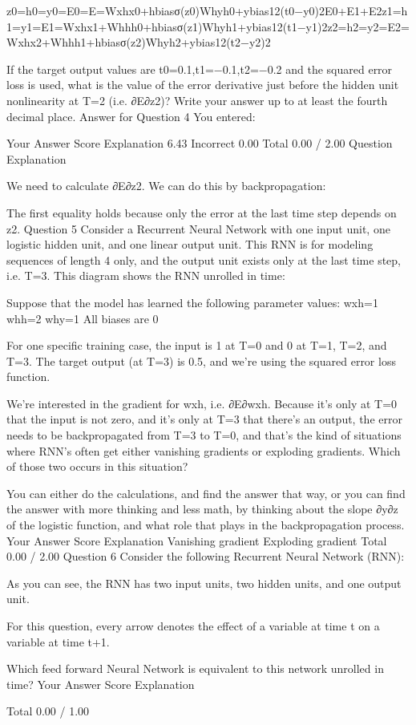 z0=h0=y0=E0=E=Wxhx0+hbiasσ(z0)Whyh0+ybias12(t0−y0)2E0+E1+E2z1=h1=y1=E1=Wxhx1+Whhh0+hbiasσ(z1)Whyh1+ybias12(t1−y1)2z2=h2=y2=E2=Wxhx2+Whhh1+hbiasσ(z2)Whyh2+ybias12(t2−y2)2

If the target output values are t0=0.1,t1=−0.1,t2=−0.2 and the squared error loss is used, what is the value of the error derivative just before the hidden unit nonlinearity at T=2 (i.e. ∂E∂z2)? Write your answer up to at least the fourth decimal place.
Answer for Question 4
You entered:

Your Answer		Score	Explanation
6.43	Incorrect	0.00	
Total		0.00 / 2.00	
Question Explanation

We need to calculate ∂E∂z2. We can do this by backpropagation:


The first equality holds because only the error at the last time step depends on z2.
Question 5
Consider a Recurrent Neural Network with one input unit, one logistic hidden unit, and one linear output unit. This RNN is for modeling sequences of length 4 only, and the output unit exists only at the last time step, i.e. T=3. This diagram shows the RNN unrolled in time:


Suppose that the model has learned the following parameter values:
wxh=1
whh=2
why=1
All biases are 0

For one specific training case, the input is 1 at T=0 and 0 at T=1, T=2, and T=3. The target output (at T=3) is 0.5, and we're using the squared error loss function.

We're interested in the gradient for wxh, i.e. ∂E∂wxh. Because it's only at T=0 that the input is not zero, and it's only at T=3 that there's an output, the error needs to be backpropagated from T=3 to T=0, and that's the kind of situations where RNN's often get either vanishing gradients or exploding gradients. Which of those two occurs in this situation?

You can either do the calculations, and find the answer that way, or you can find the answer with more thinking and less math, by thinking about the slope ∂y∂z of the logistic function, and what role that plays in the backpropagation process.
Your Answer		Score	Explanation
Vanishing gradient			
Exploding gradient			
Total		0.00 / 2.00	
Question 6
Consider the following Recurrent Neural Network (RNN): 

As you can see, the RNN has two input units, two hidden units, and one output unit.

For this question, every arrow denotes the effect of a variable at time t on a variable at time t+1.

Which feed forward Neural Network is equivalent to this network unrolled in time?
Your Answer		Score	Explanation
			
			
			
Total		0.00 / 1.00

